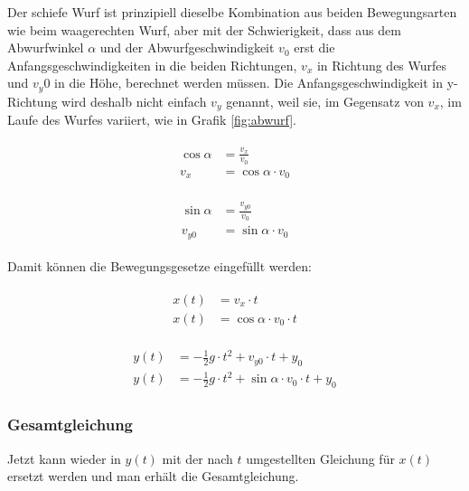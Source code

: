 Der schiefe Wurf ist prinzipiell dieselbe Kombination aus beiden Bewegungsarten wie beim waagerechten Wurf, aber mit der Schwierigkeit, dass aus dem Abwurfwinkel $\alpha$ und der Abwurfgeschwindigkeit $v_0$ erst die Anfangsgeschwindigkeiten in die beiden Richtungen, $v_x$ in Richtung des Wurfes und $v_y0$ in die Höhe, berechnet werden müssen. Die Anfangsgeschwindigkeit in y-Richtung wird deshalb nicht einfach $v_y$ genannt, weil sie, im Gegensatz von $v_x$, im Laufe des Wurfes variiert, wie in Grafik \ref{fig:abwurf}.


\begin{align}
\begin{split}
	\cos{\alpha} &= \frac{v_x}{v_0} \\
	v_x &= \cos{\alpha} \cdot v_0
\end{split}
\end{align}

\begin{align}
\begin{split}
	\sin{\alpha} &= \frac{v_{y0}}{v_0} \\
	v_{y0} &= \sin{\alpha} \cdot v_0
\end{split}
\end{align}

\noindent Damit können die Bewegungsgesetze eingefüllt werden:

\begin{align}
\begin{split}
	x(t) &= v_x \cdot t \\
	x(t) &= \cos{\alpha} \cdot v_0 \cdot t
\end{split}
\end{align}

\begin{align}
\begin{split}
	y(t) &= -\frac{1}{2}g \cdot t^2 + v_{y0} \cdot t + y_0 \\
	y(t) &= -\frac{1}{2}g \cdot t^2 + \sin{\alpha} \cdot v_0 \cdot t + y_0
\end{split}
\end{align}


\subsubsection{Gesamtgleichung}


Jetzt kann wieder in $y(t)$ mit der nach $t$ umgestellten Gleichung für $x(t)$ ersetzt werden und man erhält die Gesamtgleichung.

